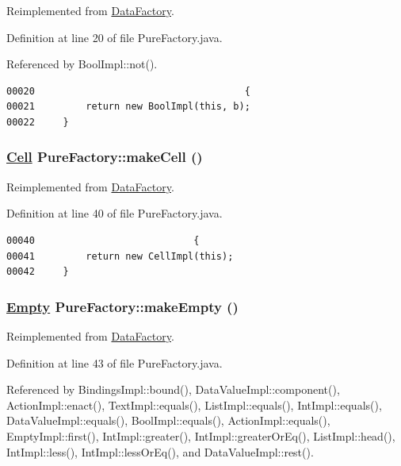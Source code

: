 Reimplemented from \hyperlink{interfaceDataFactory_a4}{Data\-Factory}.

Definition at line 20 of file Pure\-Factory.java.

Referenced by Bool\-Impl::not().

\footnotesize\begin{verbatim}00020                                     {
00021         return new BoolImpl(this, b);
00022     }
\end{verbatim}\normalsize 
\hypertarget{classPureFactory_a9}{
\subsubsection[makeCell]{\setlength{\rightskip}{0pt plus 5cm}\hyperlink{interfaceCell}{Cell} Pure\-Factory::make\-Cell ()}}
\label{classPureFactory_a9}




Reimplemented from \hyperlink{interfaceDataFactory_a11}{Data\-Factory}.

Definition at line 40 of file Pure\-Factory.java.\footnotesize\begin{verbatim}00040                            {
00041         return new CellImpl(this);
00042     }
\end{verbatim}\normalsize 
\hypertarget{classPureFactory_a10}{
\subsubsection[makeEmpty]{\setlength{\rightskip}{0pt plus 5cm}\hyperlink{interfaceEmpty}{Empty} Pure\-Factory::make\-Empty ()}}
\label{classPureFactory_a10}




Reimplemented from \hyperlink{interfaceDataFactory_a0}{Data\-Factory}.

Definition at line 43 of file Pure\-Factory.java.

Referenced by Bindings\-Impl::bound(), Data\-Value\-Impl::component(), Action\-Impl::enact(), Text\-Impl::equals(), List\-Impl::equals(), Int\-Impl::equals(), Data\-Value\-Impl::equals(), Bool\-Impl::equals(), Action\-Impl::equals(), Empty\-Impl::first(), Int\-Impl::greater(), Int\-Impl::greater\-Or\-Eq(), List\-Impl::head(), Int\-Impl::less(), Int\-Impl::less\-Or\-Eq(), and Data\-Value\-Impl::rest().

